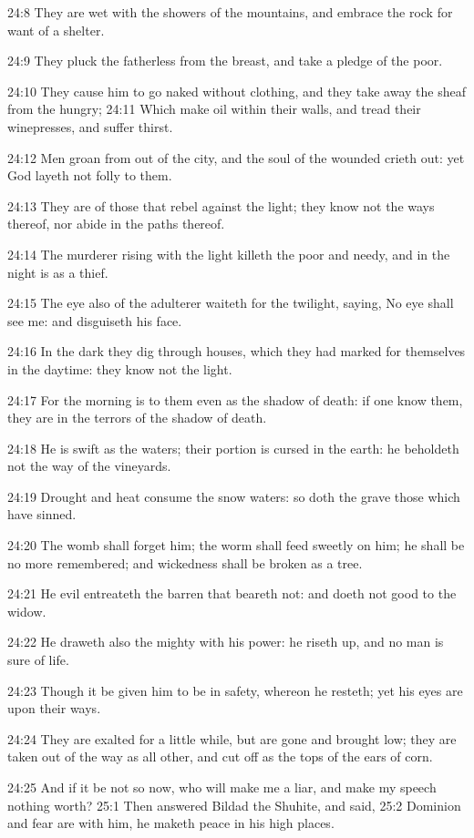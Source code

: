 24:8 They are wet with the showers of the mountains, and embrace the
rock for want of a shelter.

24:9 They pluck the fatherless from the breast, and take a pledge of
the poor.

24:10 They cause him to go naked without clothing, and they take away
the sheaf from the hungry; 24:11 Which make oil within their walls,
and tread their winepresses, and suffer thirst.

24:12 Men groan from out of the city, and the soul of the wounded
crieth out: yet God layeth not folly to them.

24:13 They are of those that rebel against the light; they know not
the ways thereof, nor abide in the paths thereof.

24:14 The murderer rising with the light killeth the poor and needy,
and in the night is as a thief.

24:15 The eye also of the adulterer waiteth for the twilight, saying,
No eye shall see me: and disguiseth his face.

24:16 In the dark they dig through houses, which they had marked for
themselves in the daytime: they know not the light.

24:17 For the morning is to them even as the shadow of death: if one
know them, they are in the terrors of the shadow of death.

24:18 He is swift as the waters; their portion is cursed in the earth:
he beholdeth not the way of the vineyards.

24:19 Drought and heat consume the snow waters: so doth the grave
those which have sinned.

24:20 The womb shall forget him; the worm shall feed sweetly on him;
he shall be no more remembered; and wickedness shall be broken as a
tree.

24:21 He evil entreateth the barren that beareth not: and doeth not
good to the widow.

24:22 He draweth also the mighty with his power: he riseth up, and no
man is sure of life.

24:23 Though it be given him to be in safety, whereon he resteth; yet
his eyes are upon their ways.

24:24 They are exalted for a little while, but are gone and brought
low; they are taken out of the way as all other, and cut off as the
tops of the ears of corn.

24:25 And if it be not so now, who will make me a liar, and make my
speech nothing worth?  25:1 Then answered Bildad the Shuhite, and
said, 25:2 Dominion and fear are with him, he maketh peace in his high
places.

